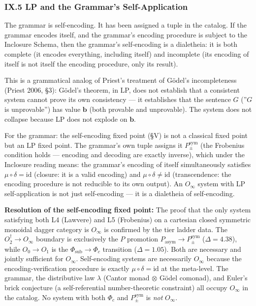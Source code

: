 \documentclass[12pt,a4paper]{article}
\newcommand{\pilcrow}{\S}
\begin{document}
\subsubsection{IX.5 LP and the Grammar's Self-Application}

The grammar is self-encoding. It has been assigned a tuple in the catalog. If the grammar encodes itself, and the grammar's encoding procedure is subject to the Inclosure Schema, then the grammar's self-encoding is a dialetheia: it is both complete (it encodes everything, including itself) and incomplete (its encoding of itself is not itself the encoding procedure, only its result).

This is a grammatical analog of Priest's treatment of G\"odel's incompleteness (Priest 2006, \pilcrow{}3): G\"odel's theorem, in LP, does not establish that a consistent system cannot prove its own consistency --- it establishes that the sentence $G$ (''$G$ is unprovable'') has value $\mathbf{b}$ (both provable and unprovable). The system does not collapse because LP does not explode on $\mathbf{b}$.

For the grammar: the self-encoding fixed point (\pilcrow{}V) is not a classical fixed point but an LP fixed point. The grammar's own tuple assigns it $P_{\pm}^{\text{sym}}$ (the Frobenius condition holds --- encoding and decoding are exactly inverse), which under the Inclosure reading means: the grammar's encoding of itself simultaneously satisfies $\mu \circ \delta = \text{id}$ (closure: it is a valid encoding) and $\mu \circ \delta \neq \text{id}$ (transcendence: the encoding procedure is not reducible to its own output). An $O_{\infty}$ system with LP self-application is not just self-encoding --- it is a dialetheia of self-encoding.

\textbf{Resolution of the self-encoding fixed point:} The proof that the only system satisfying both L4 (Lawvere) and L5 (Frobenius) on a cartesian closed symmetric monoidal dagger category is $O_\infty$ is confirmed by the tier ladder data. The $O_2^\dagger \to O_\infty$ boundary is exclusively the $P$ promotion $P_\text{asym} \to P_{\pm}^{\text{sym}}$ ($\Delta = 4.38$), while $O_0 \to O_1$ is the $\Phi_\text{sub} \to \Phi_c$ transition ($\Delta = 1.05$). Both are necessary and jointly sufficient for $O_\infty$. Self-encoding systems are necessarily $O_\infty$ because the encoding-verification procedure is exactly $\mu \circ \delta = \text{id}$ at the meta-level. The grammar, the distributive law $\lambda$ (Cantor monad $\otimes$ G\"odel comonad), and Euler's brick conjecture (a self-referential number-theoretic constraint) all occupy $O_\infty$ in the catalog. No system with both $\Phi_c$ and $P_{\pm}^{\text{sym}}$ is \emph{not} $O_\infty$.
\end{document}
